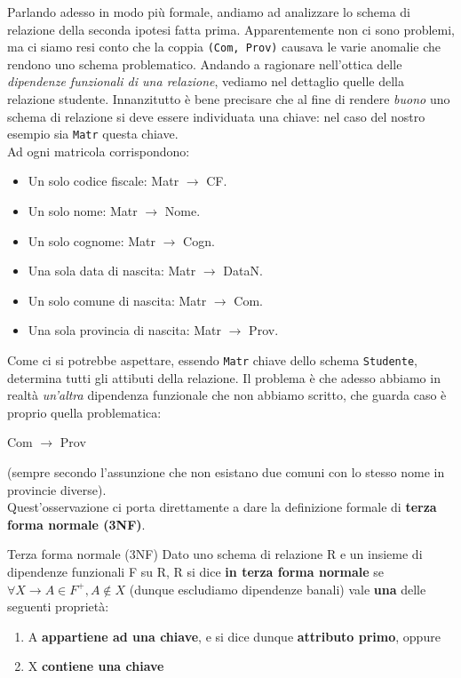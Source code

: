 \documentclass[12pt]{report}
\newcommand{\ra}{
	\rightarrow
}
\begin{document}
	Parlando adesso in modo più formale, andiamo ad analizzare lo schema di relazione della seconda ipotesi fatta prima. Apparentemente non ci sono problemi, ma ci siamo resi conto che la coppia \texttt{(Com, Prov)} causava le varie anomalie che rendono uno schema problematico. Andando a ragionare nell'ottica delle \textit{dipendenze funzionali di una relazione}, vediamo nel dettaglio quelle della relazione studente. Innanzitutto è bene precisare che al fine di rendere \textit{buono} uno schema di relazione si deve essere individuata una chiave: nel caso del nostro esempio sia \texttt{Matr} questa chiave.\\
	Ad ogni matricola corrispondono:
	\begin{itemize}
		\item Un solo codice fiscale: Matr $\ra$ CF.
		
		\item Un solo nome: Matr $\ra$ Nome.
		
		\item Un solo cognome: Matr $\ra$ Cogn.
		
		\item Una sola data di nascita: Matr $\ra$ DataN.
		
		\item Un solo comune di nascita: Matr $\ra$ Com.
		
		\item Una sola provincia di nascita: Matr $\ra$ Prov.
	\end{itemize}
	Come ci si potrebbe aspettare, essendo \texttt{Matr} chiave dello schema \texttt{Studente}, determina tutti gli attibuti della relazione. Il problema è che adesso abbiamo in realtà \textit{un'altra} dipendenza funzionale che non abbiamo scritto, che guarda caso è proprio quella problematica:
	\begin{center}
		Com $\ra$ Prov
	\end{center}
	(sempre secondo l'assunzione che non esistano due comuni con lo stesso nome in provincie diverse).\\
	Quest'osservazione ci porta direttamente a dare la definizione formale di \textbf{terza forma normale (3NF)}.
	\begin{definizione}{Terza forma normale (3NF)}{}
		Dato uno schema di relazione R e un insieme di dipendenze funzionali F su R, R si dice \textbf{in terza forma normale} se $\forall X \ra A \in F^+, A \notin X$ (dunque escludiamo dipendenze banali) vale \textbf{una} delle seguenti proprietà:
		\begin{enumerate}
			\item A \textbf{appartiene ad una chiave}, e si dice dunque \textbf{attributo primo}, oppure
			\item X \textbf{contiene una chiave}
		\end{enumerate}
	\end{definizione}
\end{document}
